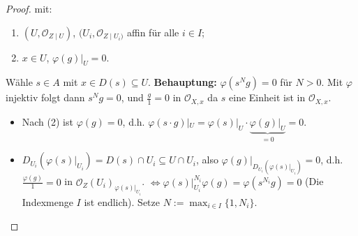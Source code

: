 \begin{proof}
  mit:
  \begin{enumerate}
  \item $(U,\mathcal{O}_{Z\mid U})$, $(U_{i},\mathcal{O}_{Z\mid U_{i})}$
    affin für alle $i\in I$;
  \item $x\in U$, $\varphi(g)|_{U}=0$.
  \end{enumerate}
  Wähle $s\in A$ mit $x\in D(s)\subseteq U$. \textbf{Behauptung: }$\varphi(s^{N}g)=0$
  für $N>0$. Mit $\varphi$ injektiv folgt dann $s^{N}g=0$, und $\frac{g}{1}=0$
  in $\mathcal{O}_{X,x}$ da $s$ eine Einheit ist in $\mathcal{O}_{X,x}$.
  \begin{itemize}
  \item Nach (2) ist $\varphi(g)=0$, d.h. $\varphi(s\cdot g)|_{U}=\varphi(s)|_{U}\cdot\underbrace{\varphi(g)|_{U}}_{=0}=0$.
  \item $D_{U_{i}}(\varphi(s)|_{U_{i}})=D(s)\cap U_{i}\subseteq U\cap U_{i}$,
    also $\varphi(g)|_{D_{U_{i}}(\varphi(s)|_{U_{i}})}=0$, d.h. $\frac{\varphi(g)}{1}=0$
    in $\mathcal{O}_{Z}(U_{i})_{\varphi(s)|_{U_{i}}}$. $\Longleftrightarrow\varphi(s)|_{U_{i}}^{N_{i}}\varphi(g)=\varphi(s^{N_{i}}g)=0$
    (Die Indexmenge $I$ ist endlich). Setze $N:=\max_{i\in I}\{1,N_{i}\}$.
  \end{itemize}
\end{proof}
